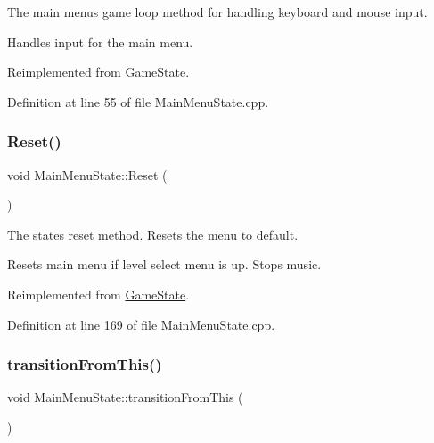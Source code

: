 The main menu\textquotesingle{}s game loop method for handling keyboard and mouse input. 

Handles input for the main menu. 

Reimplemented from \hyperlink{class_game_state_a8bce2828cee99ae7c07322804531fd01}{Game\+State}.



Definition at line 55 of file Main\+Menu\+State.\+cpp.

\mbox{\label{class_main_menu_state_a6f6c9814913db12bc9578411620f9b56}} 
\subsubsection{\texorpdfstring{Reset()}{Reset()}}
{\footnotesize\ttfamily void Main\+Menu\+State\+::\+Reset (\begin{DoxyParamCaption}{ }\end{DoxyParamCaption})\hspace{0.3cm}{\ttfamily [virtual]}}



The state\textquotesingle{}s reset method. Resets the menu to default. 

Resets main menu if level select menu is up. Stops music. 

Reimplemented from \hyperlink{class_game_state_a46ac6317883dff0eba4f8f305af6b6bb}{Game\+State}.



Definition at line 169 of file Main\+Menu\+State.\+cpp.

\mbox{\label{class_main_menu_state_a632b2e5cc71503e46a59fd29501f6869}} 
\subsubsection{\texorpdfstring{transition\+From\+This()}{transitionFromThis()}}
{\footnotesize\ttfamily void Main\+Menu\+State\+::transition\+From\+This (\begin{DoxyParamCaption}{ }\end{DoxyParamCaption})}

